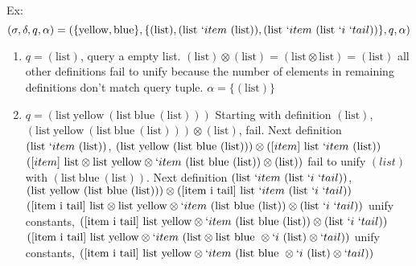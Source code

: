 \documentclass[11pt,a4paper]{report}
\newcommand{\var}[1]{`#1}
\newcommand{\unify}{\otimes}
\begin{document}
Ex:
\[
    (\sigma, \delta, q, \alpha ) = (\{\text{yellow}, \text{blue}\},
    \{
(\text{list}),
(\text{list}\ \var{item}\ (\text{list})),
(\text{list}\ \var{item}\ (\text{list}\ \var{i}\ \var{tail}))
    \}, q, \alpha)
\]

\begin{enumerate}
\item $q = (\text{list})$, query a empty list.
\subitem $(\text{list}) \unify (\text{list}) = (\text{list} \unify \text{list}) = (\text{list})$
\subitem all other definitions fail to unify because the number of elements in remaining definitions don't match query tuple.
\subitem $\alpha = \{(\text{list})\}$
\item $q = (\text{list}\ \text{yellow}\ (\text{list}\ \text{blue}\ (\text{list})))$
\subitem Starting with definition $(\text{list})$,
\subitem $(\text{list}\ \text{yellow}\ (\text{list}\ \text{blue}\ (\text{list}))) \unify (\text{list})$, fail.
\subitem Next definition $(\text{list}\ \var{item}\ (\text{list}))$,
\subitem $(\text{list}\ \text{yellow}\ (\text{list}\ \text{blue}\ (\text{list}))) \unify ([item]\ \text{list}\ \var{item}\ (\text{list}))$
\subitem $([item]\ \text{list} \unify \text{list}\ \text{yellow} \unify \var{item}\ (\text{list}\ \text{blue}\ (\text{list})) \unify (\text{list}))$
\subitem fail to unify $(list)$ with $(\text{list}\ \text{blue}\ (\text{list}))$.
\subitem Next definition $(\text{list}\ \var{item}\ (\text{list}\ \var{i}\ \var{tail}))$,
\subitem $(\text{list}\ \text{yellow}\ (\text{list}\ \text{blue}\ (\text{list}))) \unify ([\text{item}\ \text{i}\ \text{tail}]\ \text{list}\ \var{item}\ (\text{list}\ \var{i}\ \var{tail}))$
\subitem $([\text{item}\ \text{i}\ \text{tail}]\ \text{list}\unify \text{list}\ \text{yellow} \unify \var{item}\ (\text{list}\ \text{blue}\ (\text{list})) \unify (\text{list}\ \var{i}\ \var{tail}))$
\subitem unify constants,
\subitem $([\text{item}\ \text{i}\ \text{tail}]\ \text{list}\ \text{yellow} \unify \var{item}\ (\text{list}\ \text{blue}\ (\text{list})) \unify (\text{list}\ \var{i}\ \var{tail}))$
\subitem $([\text{item}\ \text{i}\ \text{tail}]\ \text{list}\ \text{yellow} \unify \var{item}\ (\text{list} \unify \text{list}\ \text{blue}\ \unify \var{i}\ (\text{list}) \unify \var{tail}))$
\subitem unify constants,
\subitem $([\text{item}\ \text{i}\ \text{tail}]\ \text{list}\ \text{yellow} \unify \var{item}\ (\text{list}\ \text{blue}\ \unify \var{i}\ (\text{list}) \unify \var{tail}))$


\end{enumerate}
\end{document}
